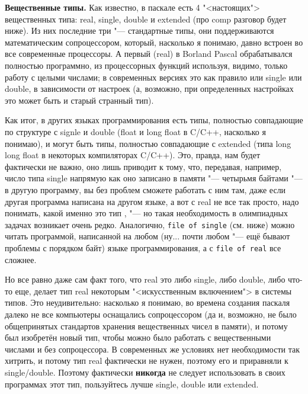 

\textbf{Вещественные типы.} Как известно, в паскале есть 4 "<настоящих"> вещественных типа: 
real, single, double и extended (про comp разговор будет ниже). Из них последние три "--- 
стандартные типы, они поддерживаются математическим сопроцессором, который, насколько я понимаю, 
давно встроен во все современные  процессоры. А первый (real) в Borland Pascal обрабатывался 
полностью программно, из процессорных функций используя, 
видимо, только работу с целыми числами; в современных версиях это как правило или single или 
double, в зависимости от настроек (а, возможно, при определенных настройках это может быть и старый странный тип).  

Как итог, в других языках программирования есть типы, полностью совпадающие 
по структуре с signle и double (float и long float в C/C++, насколько я понимаю), и могут быть 
типы, полностью совпадающие с extended (типа long long float в некоторых компиляторах C/C++). 
Это, правда, нам будет фактически не  
важно, оно лишь приводит к тому, что, передавая, например, число типа single напрямую как оно записано в 
памяти "--- четырьмя байтами "--- в другую программу, вы без проблем сможете работать с ним там, 
даже если другая программа написана на другом языке, а вот с real не все так просто, надо понимать, какой именно это тип , "--- но такая 
необходимость в олимпиадных задачах возникает очень редко.
Аналогично, \texttt{file of single} (см. ниже) можно читать программой, написанной на любом (ну... 
почти любом "--- ещё бывают проблемы с порядком байт) языке программирования, а с \texttt{file of 
real} все сложнее.

Но все равно даже сам факт того, что real это либо single, либо double, либо что-то еще, делает тип real некоторым "<искусственным 
включением"> в системы типов. Это неудивительно: насколько я понимаю, во времена создания паскаля 
далеко не все компьютеры оснащались сопроцессором (да и, возможно, не было общепринятых стандартов 
хранения вещественных чисел в памяти), и потому был изобретён новый тип, чтобы можно было работать 
с вещественными числами и без сопроцессора. В современных же условиях нет необходимости так 
хитрить, и потому тип real фактически не нужен, поэтому его и приравняли к single/double. Поэтому 
фактически \textbf{никогда} не следует использовать в своих программах этот тип, пользуйтесь лучше single, double или extended. 

